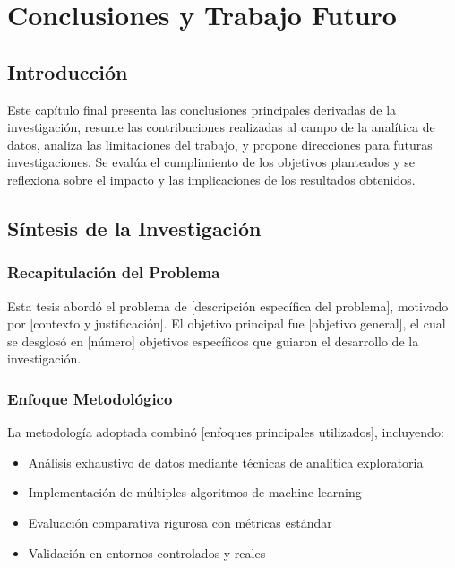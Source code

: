 
\chapter{Conclusiones y Trabajo Futuro}

\section{Introducción}

Este capítulo final presenta las conclusiones principales derivadas de la investigación, resume las contribuciones realizadas al campo de la analítica de datos, analiza las limitaciones del trabajo, y propone direcciones para futuras investigaciones. Se evalúa el cumplimiento de los objetivos planteados y se reflexiona sobre el impacto y las implicaciones de los resultados obtenidos.

\section{Síntesis de la Investigación}

\subsection{Recapitulación del Problema}

Esta tesis abordó el problema de [descripción específica del problema], motivado por [contexto y justificación]. El objetivo principal fue [objetivo general], el cual se desglosó en [número] objetivos específicos que guiaron el desarrollo de la investigación.

\subsection{Enfoque Metodológico}

La metodología adoptada combinó [enfoques principales utilizados], incluyendo:

\begin{itemize}
    \item Análisis exhaustivo de datos mediante técnicas de analítica exploratoria
    \item Implementación de múltiples algoritmos de machine learning
    \item Evaluación comparativa rigurosa con métricas estándar
    \item Validación en entornos controlados y reales
\end{itemize}

